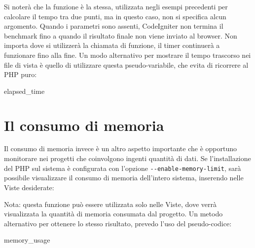 Si noterà che la funzione è la stessa, utilizzata negli esempi precedenti per calcolare il tempo tra due punti, ma in questo caso, non si specifica alcun argomento. Quando i parametri sono assenti, CodeIgniter non termina il benchmark fino a quando il risultato finale non viene inviato al browser. Non importa dove si utilizzerà la chiamata di funzione, il timer continuerà a funzionare fino alla fine. Un modo alternativo per mostrare il tempo trascorso nei file di vista è quello di utilizzare questa pseudo-variabile, che evita di ricorrere al \ac{PHP} puro:

\begin{code}
{elapsed_time}
\end{code}

\section*{Il consumo di memoria}
Il consumo di memoria invece è un altro aspetto importante che è opportuno monitorare nei progetti che coinvolgono ingenti quantità di dati. Se l'installazione del \ac{PHP} sul sistema è configurata con l'opzione \verb|--enable-memory-limit|, sarà possibile visualizzare il consumo di memoria dell'intero sistema, inserendo nelle Viste desiderate:


Nota: questa funzione può essere utilizzata solo nelle Viste, dove verrà visualizzata la quantità di memoria consumata dal progetto. Un metodo alternativo per ottenere lo stesso risultato, prevedo l'uso del pseudo-codice:

\begin{code}
{memory_usage}
\end{code}
